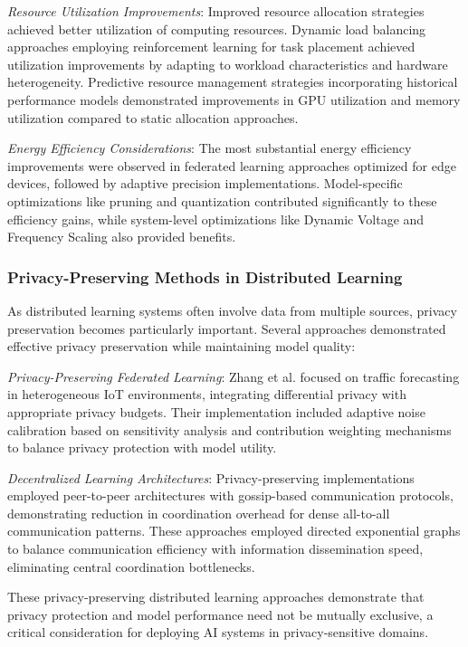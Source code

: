 \textit{Resource Utilization Improvements}: Improved resource allocation strategies achieved better utilization of computing resources. Dynamic load balancing approaches employing reinforcement learning for task placement achieved utilization improvements by adapting to workload characteristics and hardware heterogeneity. Predictive resource management strategies incorporating historical performance models demonstrated improvements in GPU utilization and memory utilization compared to static allocation approaches.

\textit{Energy Efficiency Considerations}: The most substantial energy efficiency improvements were observed in federated learning approaches optimized for edge devices, followed by adaptive precision implementations. Model-specific optimizations like pruning and quantization contributed significantly to these efficiency gains, while system-level optimizations like Dynamic Voltage and Frequency Scaling also provided benefits.

\subsubsection{Privacy-Preserving Methods in Distributed Learning}
As distributed learning systems often involve data from multiple sources, privacy preservation becomes particularly important. Several approaches demonstrated effective privacy preservation while maintaining model quality:

\textit{Privacy-Preserving Federated Learning}: Zhang et al. \citep{Zhang20229876} focused on traffic forecasting in heterogeneous IoT environments, integrating differential privacy with appropriate privacy budgets. Their implementation included adaptive noise calibration based on sensitivity analysis and contribution weighting mechanisms to balance privacy protection with model utility.

\textit{Decentralized Learning Architectures}: Privacy-preserving implementations employed peer-to-peer architectures with gossip-based communication protocols, demonstrating reduction in coordination overhead for dense all-to-all communication patterns. These approaches employed directed exponential graphs to balance communication efficiency with information dissemination speed, eliminating central coordination bottlenecks.

These privacy-preserving distributed learning approaches demonstrate that privacy protection and model performance need not be mutually exclusive, a critical consideration for deploying AI systems in privacy-sensitive domains.

